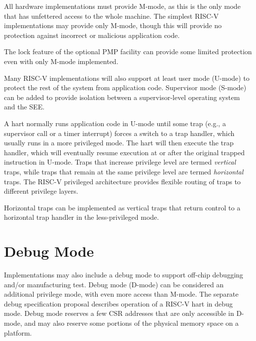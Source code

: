 All hardware implementations must provide M-mode, as this is the only
mode that has unfettered access to the whole machine.  The simplest
RISC-V implementations may provide only M-mode, though this will
provide no protection against incorrect or malicious application code.

\begin{commentary}
  The lock feature of the optional PMP facility can provide some
  limited protection even with only M-mode implemented.
\end{commentary}

Many RISC-V implementations will also support at least user mode
(U-mode) to protect the rest of the system from application code.
Supervisor mode (S-mode) can be added to provide isolation between a
supervisor-level operating system and the SEE.

A hart normally runs application code in U-mode until some trap (e.g.,
a supervisor call or a timer interrupt) forces a switch to a trap
handler, which usually runs in a more privileged mode. The hart will
then execute the trap handler, which will eventually resume execution
at or after the original trapped instruction in U-mode.  Traps that
increase privilege level are termed {\em vertical} traps, while traps
that remain at the same privilege level are termed {\em horizontal}
traps.  The RISC-V privileged architecture provides flexible routing
of traps to different privilege layers.

\begin{commentary}
Horizontal traps can be implemented as vertical traps that
return control to a horizontal trap handler in the less-privileged mode.
\end{commentary}

\section{Debug Mode}

Implementations may also include a debug mode to support off-chip
debugging and/or manufacturing test.  Debug mode (D-mode) can be
considered an additional privilege mode, with even more access than
M-mode. The separate debug specification proposal describes operation
of a RISC-V hart in debug mode.  Debug mode reserves a few CSR
addresses that are only accessible in D-mode, and may also reserve
some portions of the physical memory space on a platform.
